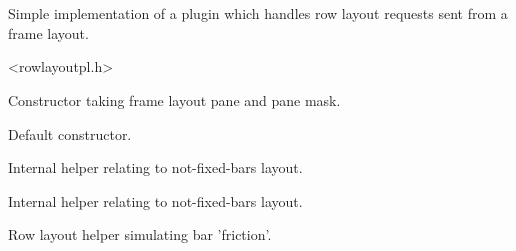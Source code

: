 %
%


\section{}\label{cbrowlayoutplugin}


Simple implementation of a plugin which handles row layout
requests sent from a frame layout.




<rowlayoutpl.h>




\label{cbrowlayoutplugincbrowlayoutplugin}


Constructor taking frame layout pane and pane mask.



Default constructor.


\label{cbrowlayoutpluginadjustlengthofinserted}


Internal helper relating to not-fixed-bars layout.


\label{cbrowlayoutpluginapplylengthratios}


Internal helper relating to not-fixed-bars layout.


\label{cbrowlayoutplugincalcrowheight}


Row layout helper simulating bar 'friction'.


\label{cbrowlayoutplugincheckifattheboundary}


